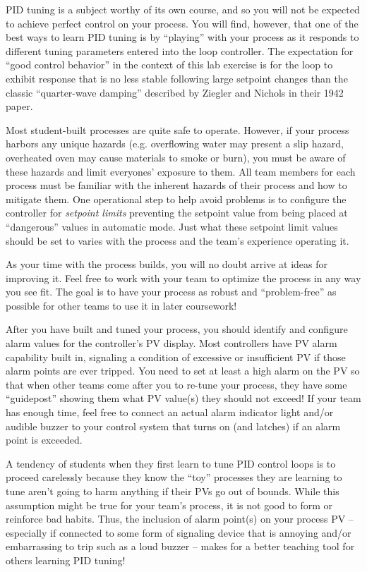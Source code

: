 \documentclass[12pt,a4paper]{book}
\begin{document}
PID tuning is a subject worthy of its own course, and so you will not be expected to achieve perfect control on your process.  You will find, however, that one of the best ways to learn PID tuning is by ``playing'' with your process as it responds to different tuning parameters entered into the loop controller.  The expectation for ``good control behavior'' in the context of this lab exercise is for the loop to exhibit response that is no less stable following large setpoint changes than the classic ``quarter-wave damping'' described by Ziegler and Nichols in their 1942 paper.

\vskip 10pt

Most student-built processes are quite safe to operate.  However, if your process harbors any unique hazards (e.g. overflowing water may present a slip hazard, overheated oven may cause materials to smoke or burn), you must be aware of these hazards and limit everyones' exposure to them.  All team members for each process must be familiar with the inherent hazards of their process and how to mitigate them.  One operational step to help avoid problems is to configure the controller for {\it setpoint limits} preventing the setpoint value from being placed at ``dangerous'' values in automatic mode.  Just what these setpoint limit values should be set to varies with the process and the team's experience operating it.

As your time with the process builds, you will no doubt arrive at ideas for improving it.  Feel free to work with your team to optimize the process in any way you see fit.  The goal is to have your process as robust and ``problem-free'' as possible for other teams to use it in later coursework!

\vskip 10pt

After you have built and tuned your process, you should identify and configure alarm values for the controller's PV display.  Most controllers have PV alarm capability built in, signaling a condition of excessive or insufficient PV if those alarm points are ever tripped.  You need to set at least a high alarm on the PV so that when other teams come after you to re-tune your process, they have some ``guidepost'' showing them what PV value(s) they should not exceed!  If your team has enough time, feel free to connect an actual alarm indicator light and/or audible buzzer to your control system that turns on (and latches) if an alarm point is exceeded.

A tendency of students when they first learn to tune PID control loops is to proceed carelessly because they know the ``toy'' processes they are learning to tune aren't going to harm anything if their PVs go out of bounds.  While this assumption might be true for your team's process, it is not good to form or reinforce bad habits.  Thus, the inclusion of alarm point(s) on your process PV -- especially if connected to some form of signaling device that is annoying and/or embarrassing to trip such as a loud buzzer -- makes for a better teaching tool for others learning PID tuning!
\end{document}
